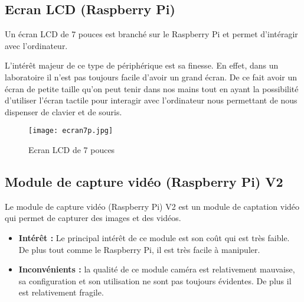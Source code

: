  
        \subsection{Ecran LCD (Raspberry Pi)}
        Un écran LCD de 7 pouces est branché sur le Raspberry Pi et permet d'intéragir avec l'ordinateur.

        \vspace{0.2cm}

        L'intérêt majeur de ce type de périphérique est sa finesse.
        En effet, dans un laboratoire il n’est pas toujours facile d'avoir un grand écran.
        De ce fait avoir un écran de petite taille qu'on peut tenir dans nos mains tout en ayant la possibilité d'utiliser l'écran tactile pour interagir avec l'ordinateur nous permettant de nous dispenser de clavier et de souris.

        \begin{figure}[ht]
            \centering
            \texttt{[image: ecran7p.jpg]} 
            \caption{Ecran LCD de 7 pouces}
        \end{figure}

        \vspace{1cm}

        \subsection{Module de capture vidéo (Raspberry Pi) V2}
        Le module de capture vidéo (Raspberry Pi) V2 est un module de captation vidéo qui permet de capturer des images et des vidéos.


        \begin{flushleft}
            \begin{itemize}
                \item \textbf{Intérêt :}
                Le principal intérêt de ce module est son coût qui est très faible. De plus tout comme le Raspberry Pi, il est très facile à manipuler. 
                \item \textbf{Inconvénients :}
                la qualité de ce module caméra est relativement mauvaise, sa configuration et son utilisation ne sont pas toujours évidentes.
                De plus il est relativement fragile.
            \end{itemize}                
        \end{flushleft}

